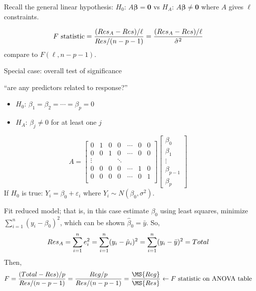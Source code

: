 Recall the general linear hypothesis:
$ H_0 $: $ A\symbf{\beta}=\symbf{0} $
vs $ H_A $: $ A\symbf{\beta}\neq \symbf{0} $
where $ A $ gives $ \ell $ constraints.

\[ F\text{ statistic}=
    \frac{(\relax{Res}_A-\relax{Res})/\ell}{\relax{Res}/(n-p-1)}=
    \frac{(\relax{Res}_A-\relax{Res})/\ell}{\hat{\sigma}^2}  \]
compare to $ F(\ell,n-p-1) $.

Special case: overall test of significance

``are any predictors related to response?''
\begin{itemize}
    \item $ H_0 $: $ \beta_1=\beta_2=\cdots=\beta_p=0 $
    \item $ H_A $: $ \beta_j\neq 0 $ for at least one $ j $
\end{itemize}
\[ A=\begin{bmatrix}
        0      & 1 & 0 & 0      & \cdots & 0 & 0 \\
        0      & 0 & 1 & 0      & \cdots & 0 & 0 \\
        \vdots &   &   & \ddots                  \\
        0      & 0 & 0 & 0      & \cdots & 1 & 0 \\
        0      & 0 & 0 & 0      & \cdots & 0 & 1 \\
    \end{bmatrix}\begin{bmatrix}
        \beta_0     \\
        \beta_1     \\
        \vdots      \\
        \beta_{p-1} \\
        \beta_p
    \end{bmatrix} \]
If $ H_0 $ is true: $ Y_i=\beta_0+\varepsilon_i $
where $ Y_i \sim N(\beta_0,\sigma^2) $.

Fit reduced model; that is, in this case estimate $ \beta_0 $
using least squares, minimize $ \sum_{i=1}^{n} (y_i-\beta_0)^2 $,
which can be shown $ \hat{\beta}_0=\bar{y} $. So,
\[ \relax{Res}_A
    =\sum_{i=1}^{n} e_i^2
    =\sum_{i=1}^{n} (y_i-\hat{\mu}_i)^2
    =\sum_{i=1}^{n}(y_i-\bar{y})^2
    =\relax{Total} \]
Then,
\[ F=\frac{(\SS{Total}-\SS{Res})/p}{\SS{Res}/(n-p-1)}
    =\frac{\SS{Reg}/p}{\SS{Res}/(n-p-1)}
    =\frac{\MS{Reg}}{\MS{Res}}
    \leftarrow F\text{ statistic on ANOVA table}    \]
